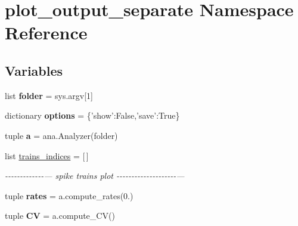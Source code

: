 \hypertarget{namespaceplot__output__separate}{\section{plot\-\_\-output\-\_\-separate Namespace Reference}
\label{namespaceplot__output__separate}
}
\subsection*{Variables}
\begin{DoxyCompactItemize}
\item 
\hypertarget{namespaceplot__output__separate_a603182846df8849dcd5a3ab336ee003e}{list {\bfseries folder} = sys.\-argv\mbox{[}1\mbox{]}}\label{namespaceplot__output__separate_a603182846df8849dcd5a3ab336ee003e}

\item 
\hypertarget{namespaceplot__output__separate_a029832f59ed28947bfdf85bc6a14fdc5}{dictionary {\bfseries options} = \{'show'\-:False,'save'\-:True\}}\label{namespaceplot__output__separate_a029832f59ed28947bfdf85bc6a14fdc5}

\item 
\hypertarget{namespaceplot__output__separate_ae1e61355d5199e72f5c18e4f2b2d1a68}{tuple {\bfseries a} = ana.\-Analyzer(folder)}\label{namespaceplot__output__separate_ae1e61355d5199e72f5c18e4f2b2d1a68}

\item 
\hypertarget{namespaceplot__output__separate_a664ddd31dddedb676a85f961fb52df8f}{list \hyperlink{namespaceplot__output__separate_a664ddd31dddedb676a85f961fb52df8f}{trains\-\_\-indices} = \mbox{[}$\,$\mbox{]}}\label{namespaceplot__output__separate_a664ddd31dddedb676a85f961fb52df8f}

\begin{DoxyCompactList}\small\item\em -\/-\/-\/-\/-\/-\/-\/-\/-\/-\/-\/-\/-\/--- spike trains plot -\/-\/-\/-\/-\/-\/-\/-\/-\/-\/-\/-\/-\/-\/-\/-\/-\/-\/-\/-\/--- \end{DoxyCompactList}\item 
\hypertarget{namespaceplot__output__separate_aec5834229c886ff9e8f72d85a5322686}{tuple {\bfseries rates} = a.\-compute\-\_\-rates(0.)}\label{namespaceplot__output__separate_aec5834229c886ff9e8f72d85a5322686}

\item 
\hypertarget{namespaceplot__output__separate_ad2ec90ce3d694cb584c1ce1fb0ca6b21}{tuple {\bfseries C\-V} = a.\-compute\-\_\-\-C\-V()}\label{namespaceplot__output__separate_ad2ec90ce3d694cb584c1ce1fb0ca6b21}


\end{DoxyCompactItemize}
